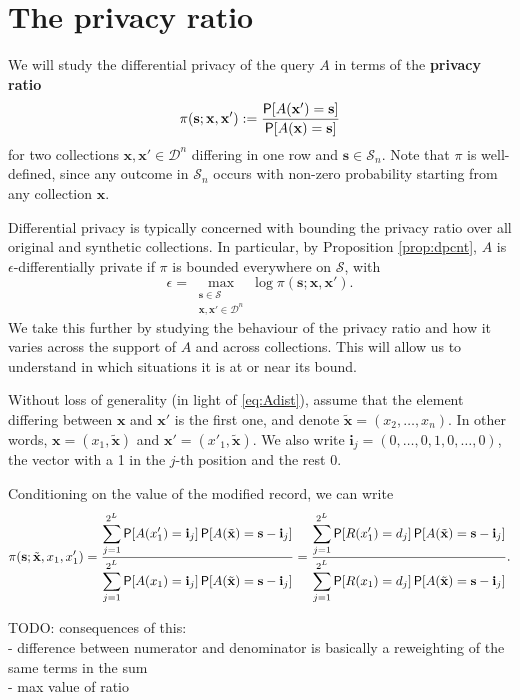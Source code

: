 \documentclass[11pt,draft]{article}
\newcommand{\Dsp}{\mathcal{D}}
\newcommand{\Ssp}{\mathcal{S}}
\newcommand{\xv}{\mathbf{x}}
\newcommand{\sv}{\mathbf{s}}
\newcommand{\xvt}{\tilde{\xv}}
\newcommand{\sm}{\sv^-}
\newcommand{\iv}{\mathbf{i}}
\begin{document}
\section{The privacy ratio}

We will study the differential privacy of the query $A$ in terms of the \textbf{privacy ratio}
\[ \pi(\sv;\xv,\xv') := \frac{\P[A(\xv') = \sv]}{\P[A(\xv) = \sv]} \]
for two collections $\xv,\xv'\in\Dsp^n$ differing in one row and $\sv \in\Ssp_n$.
Note that $\pi$ is well-defined, since any outcome in $\Ssp_n$ occurs with non-zero probability starting from any collection $\xv$.

Differential privacy is typically concerned with bounding the privacy ratio over all original and synthetic collections.
In particular, by Proposition \ref{prop:dpcnt}, $A$ is $\epsilon$-differentially private if $\pi$ is bounded everywhere on $\Ssp$,
with
\[ \epsilon = \max_{\substack{\sv\in\Ssp\\ \xv,\xv' \in \Dsp^n}} \log\pi(\sv;\xv,\xv'). \]
We take this further by studying the behaviour of the privacy ratio and how it varies across the support of $A$ and across collections. This will allow us to understand in which situations it is at or near its bound.

Without loss of generality (in light of \eqref{eq:Adist}), assume that the element differing between $\xv$ and $\xv'$ is the first one, and denote $\xvt = (x_2,\dots,x_n)$.
In other words, $\xv = (x_1,\xvt)$ and $\xv' = (x'_1, \xvt)$.
We also write $\iv_j = (0,\dots,0,1,0,\dots,0)$, the vector with a 1 in the $j$-th position and the rest 0.

Conditioning on the value of the modified record, we can write
\begin{equation} \label{eq:prcond}
\pi(\sv;\xvt,x_1,x_1') = \frac{\displaystyle\sum_{j=1}^{2^L}
\P[A(x'_1) = \iv_j] \P[A(\xvt) = \sv - \iv_j]}
{\displaystyle\sum_{j=1}^{2^L}
\P[A(x_1) = \iv_j] \P[A(\xvt) = \sv - \iv_j]}
= \frac{\displaystyle\sum_{j=1}^{2^L}
\P[R(x'_1) = d_j] \P[A(\xvt) = \sv - \iv_j]}
{\displaystyle\sum_{j=1}^{2^L}
\P[R(x_1) = d_j] \P[A(\xvt) = \sv - \iv_j]}.
\end{equation}

TODO: consequences of this: \\
- difference between numerator and denominator is basically a reweighting of the same terms in the sum \\
- max value of ratio
\end{document}
